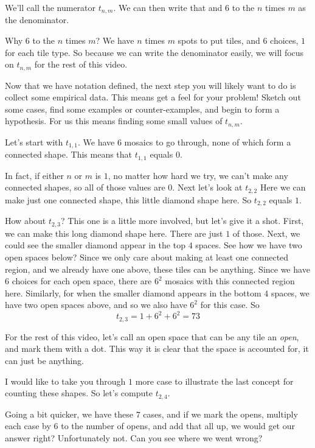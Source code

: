 \documentclass[12pt]{article}
\theoremstyle{plain}
\theoremstyle{definition}
\theoremstyle{remark}
\theoremstyle{definition}
\begin{document}
We'll call the numerator $t_{n,m}$. We can then write that and $6$ to the $n$ times $m$ as the denominator.

Why $6$ to the $n$ times $m$? We have $n$ times $m$ spots to put tiles, and $6$ choices, $1$ for each tile type. So because we can write the denominator easily, we will focus on $t_{n,m}$ for the rest of this video.

Now that we have notation defined, the next step you will likely want to do is collect some empirical data. This means get a feel for your problem! Sketch out some cases, find some examples or counter-examples, and begin to form a hypothesis. For us this means finding some small values of $t_{n,m}$. 

Let's start with $t_{1,1}$. We have $6$ mosaics to go through, none of which form a connected shape. This means that $t_{1,1}$ equals $0$. 

In fact, if either $n$ or $m$ is $1$, no matter how hard we try, we can't make any connected shapes, so all of those values are $0$. 
Next let's look at $t_{2,2}$
Here we can make just one connected shape, this little diamond shape here. So $t_{2,2}$ equals $1$. 

How about $t_{2,3}$? 
This one is a little more involved, but let's give it a shot. First, we can make this long diamond shape here. There are just $1$ of those. Next, we could see the smaller diamond appear in the top $4$ spaces. See how we have two open spaces below? Since we only care about making at least one connected region, and we already have one above, these tiles can be anything. Since we have $6$ choices for each open space, there are $6^2$ mosaics with this connected region here. Similarly, for when the smaller diamond appears in the bottom $4$ spaces, we have two open spaces above, and so we also have $6^2$ for this case. So 
$$t_{2,3} = 1 + 6^2 + 6^2 = 73$$

For the rest of this video, let's call an open space that can be any tile an \textit{open}, and mark them with a dot. This way it is clear that the space is accounted for, it can just be anything.

I would like to take you through $1$ more case to illustrate the last concept for counting these shapes. So let's compute $t_{2,4}$.

Going a bit quicker, we have these $7$ cases, and if we mark the opens, multiply each case by $6$ to the number of opens, and add that all up, we would get our answer right? Unfortunately not. Can you see where we went wrong? 
\end{document}
